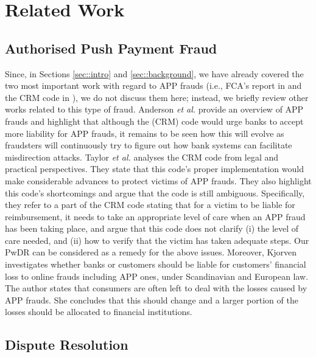 
\section{Related Work}\label{sec::related-work}


\subsection{Authorised Push Payment Fraud}

Since, in Sections \ref{sec::intro} and \ref{sec::background}, we have already covered the two most important work  with regard to APP frauds  (i.e.,  FCA's  report in \cite{2021-Half-Year-Fraud-Update} and the CRM code in \cite{CRM-code}), we do not discuss them here; instead,  we briefly  review other works related to this type of fraud. Anderson \textit{et al.} \cite{anderson2019measuring} provide an overview of APP frauds and highlight that although  the (CRM) code would urge  banks to accept more liability for APP frauds, it remains to be seen how this will evolve as   fraudsters will continuously try to figure out how bank systems can facilitate misdirection attacks. Taylor \textit{et al.} \cite{taylor2020new} analyses the CRM code from legal and practical perspectives. They  state that this code's proper implementation would make considerable advances to protect victims of APP frauds. They also highlight this code's shortcomings and argue that the code is still ambiguous. Specifically, they refer to a part of the  CRM code  stating that for a victim to be liable for reimbursement,  it needs to take an appropriate level of  care when an APP fraud has been taking place, and argue that   this  code does not  clarify (i)  the level of care needed,  and (ii) how to verify that the victim has taken adequate steps. Our PwDR  can be considered as a remedy for the above issues.   Moreover, Kjorven \cite{kjorven2020pays} investigates whether banks or customers should be liable for customers' financial loss to online  frauds including APP ones, under Scandinavian and European law. The author states  that consumers are often left to deal with the losses caused by APP frauds. She concludes that this should change and  a larger portion of the losses should be allocated to financial institutions.


\subsection{Dispute Resolution}

